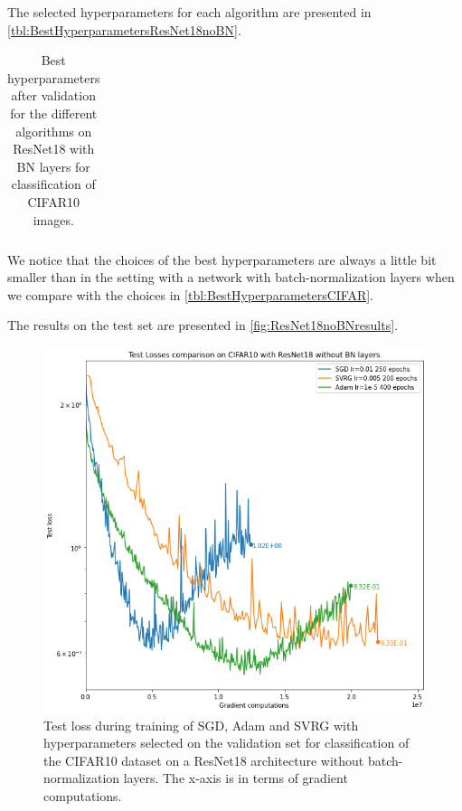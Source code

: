\documentclass[a4paper,11pt,oneside]{report}
\begin{document}
The selected hyperparameters for each algorithm are presented in \autoref{tbl:BestHyperparametersResNet18noBN}.

\begin{table}
    \begin{center}
        \begin{tabular}{||c | c | l||}
             \hline
             
        \end{tabular}
    \end{center}
    \caption{Best hyperparameters after validation for the different algorithms on ResNet18 with BN layers for classification of CIFAR10 images.
    }
    \label{tbl:BestHyperparametersResNet18noBN}
\end{table}

We notice that the choices of the best hyperparameters are always a little bit smaller than in the setting with a network with batch-normalization layers when we compare with the choices in \autoref{tbl:BestHyperparametersCIFAR}.

The results on the test set are presented in \autoref{fig:ResNet18noBNresults}.

\begin{figure}
    \centering
    \includegraphics[width=\columnwidth]{figures/ResNet18noBNResults.png}
    \caption{Test loss during training of SGD, Adam and SVRG with hyperparameters selected on the validation set for classification of the CIFAR10 dataset on a ResNet18 architecture without batch-normalization layers. The x-axis is in terms of gradient computations.}
    \label{fig:ResNet18noBNresults}
\end{figure}
\end{document}
